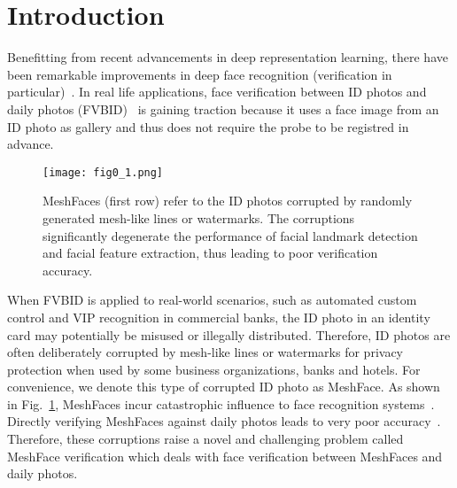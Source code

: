 \documentclass[10pt,twocolumn,letterpaper]{article}
\begin{document}
\section{Introduction}\label{sec:intro}






Benefitting from recent advancements in deep representation learning, there have been remarkable improvements in deep face recognition (verification in particular)~\cite{schroff2015facenet,sun2014deep,taigman2014deepface}. In real life applications, face verification between ID photos and daily photos (FVBID)~\cite{zhou2015naive} is gaining traction because it uses a face image from an ID photo as gallery and thus does not require the probe to be registred in advance.




\begin{figure}
  \centering
    \texttt{[image: fig0\_1.png]}
    \caption{MeshFaces (first row) refer to the ID photos corrupted by randomly generated mesh-like lines or watermarks. The corruptions significantly degenerate the performance of facial landmark detection and facial feature extraction, thus leading to poor verification accuracy.}
    \label{fig:spn} %
\end{figure}



When FVBID is applied to real-world scenarios, such as automated custom control and VIP recognition in commercial banks, the ID photo in an identity card may potentially be misused or illegally distributed. Therefore, ID photos are often deliberately corrupted by mesh-like lines or watermarks for privacy protection when used by some business organizations, \eg banks and hotels. For convenience, we denote this type of corrupted ID photo as MeshFace. As shown in Fig.~\ref{fig:spn}, MeshFaces incur catastrophic influence to face recognition systems~\cite{Burgos-Artizzu_2013_ICCV,he}. Directly verifying MeshFaces against daily photos leads to very poor accuracy~\cite{7550058}. Therefore, these corruptions raise a novel and challenging problem called MeshFace verification which deals with face verification between MeshFaces and daily photos.
\end{document}
